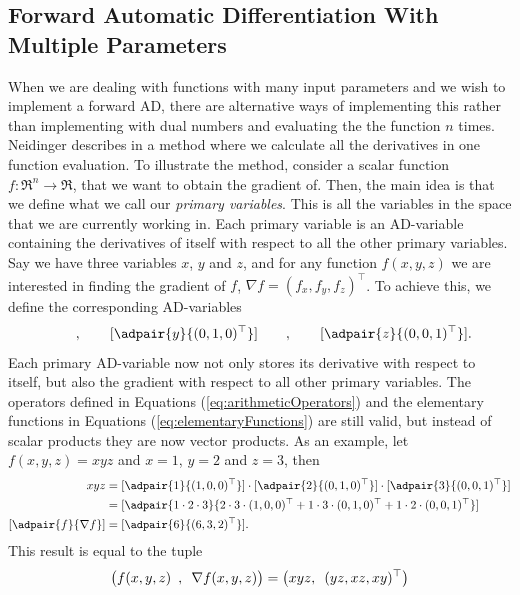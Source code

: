 \subsection{Forward Automatic Differentiation With Multiple Parameters}
When we are dealing with functions with many input parameters and we wish to implement a forward AD, there are alternative ways of implementing this rather than implementing with dual numbers and evaluating the the function $n$ times. Neidinger describes in \emph{\citet{doi:10.1137/080743627}} a method where we calculate all the derivatives in one function evaluation. To illustrate the method, consider a scalar function $f: \Re^n \rightarrow \Re$, that we want to obtain the gradient of. Then, the main idea is that we define what we call our \textit{primary variables}. This is all the variables in the space that we are currently working in. Each primary variable is an AD-variable containing the derivatives of itself with respect to all the other primary variables. Say we have three variables $x$, $y$ and $z$, and for any function $f(x,y,z)$ we are interested in finding the gradient of $f$, $\nabla f=(f_x, f_y, f_z)^\top$. To achieve this, we define the corresponding AD-variables
\begin{equation*}
    [\adpair{x}{(1,0,0)^\top}]\hspace{2em},\hspace{2em}
    [\adpair{y}{(0,1,0)^\top}]\hspace{2em},\hspace{2em}
    [\adpair{z}{(0,0,1)^\top}].
\end{equation*}
Each primary AD-variable now not only stores its derivative with respect to itself, but also the gradient with respect to all other primary variables. The operators defined in Equations (\ref{eq:arithmeticOperators}) and the elementary functions in Equations (\ref{eq:elementaryFunctions}) are still valid, but instead of scalar products they are now vector products. As an example, let $f(x,y,z) = xyz$ and $x = 1$, $y = 2$ and $z = 3$, then
\begin{align*}
    xyz &= [\adpair{1}{(1,0,0)^\top}]\cdot [\adpair{2}{(0,1,0)^\top}]\cdot
    [\adpair{3}{(0,0,1)^\top}] \\
    &=[\adpair{1\cdot 2\cdot 3}{2\cdot3\cdot(1,0,0)^\top + 1\cdot3\cdot(0,1,0)^\top + 1\cdot2\cdot(0,0,1)^\top}] \\
    [\adpair{f}{\nabla f}] &= [\adpair{6}{(6,3,2)^\top}].
\end{align*}
This result is equal to the tuple
\begin{equation*}
    \big(f(x,y,z) \hspace{0.5em},\hspace{0.5em} \nabla f(x,y,z)\big) = \big(xyz ,\hspace{0.5em} (yz,xz,xy)^\top\big)
\end{equation*}

